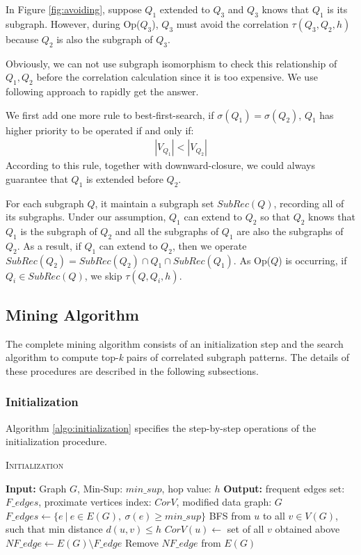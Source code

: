 \begin{exple}
	In Figure \ref{fig:avoiding}, suppose $Q_1$ extended to $Q_3$ and $Q_3$ knows that $Q_1$ is its subgraph. However, during {\sf Op($Q_3$)}, $Q_3$ must avoid the correlation $\tau(Q_3,Q_2,h)$ because $Q_2$ is also the subgraph of $Q_3$.
\end{exple}


Obviously, we can not use subgraph isomorphism to check this relationship of $Q_1,Q_2$ before the correlation calculation since it is too expensive. We use following approach to rapidly get the answer.
\par We first add one more rule to best-first-search, if $\sigma(Q_1)=\sigma(Q_2)$, $Q_1$ has higher priority to be operated if and only if:
\begin{align*} |V_{Q_1}|<|V_{Q_2}| \end{align*}
According to this rule, together with downward-closure, we could always
guarantee that $Q_1$ is extended before $Q_2$. \par For each subgraph $Q$, it
maintain a subgraph set $SubRec(Q)$, recording all of its subgraphs. Under our
assumption, $Q_1$ can extend to $Q_2$ so that $Q_2$ knows that $Q_1$ is the
subgraph of $Q_2$ and all the subgraphs of $Q_1$ are also the subgraphs of
$Q_2$. As a result, if $Q_1$ can extend to $Q_2$, then we operate
$SubRec(Q_2)=SubRec(Q_2)\cap Q_1\cap SubRec(Q_1)$. As {\sf Op($Q$)} is
occurring, if $Q_i\in SubRec(Q)$, we skip $\tau(Q,Q_i,h)$.

\subsection{Mining Algorithm}
\label{subsec:miningalgo}
The complete mining algorithm consists of an initialization step and the search
algorithm to compute top-\textit{k} pairs of correlated subgraph patterns. The
details of these procedures are described in the following subsections.
\subsubsection{Initialization}
\label{subsec:initialization}
Algorithm \ref{algo:initialization} specifies the step-by-step operations of the
initialization procedure.

\begin{algorithm}%
	\caption{\textsc{Initialization}}\label{algo:initialization}
	\dontprintsemicolon
	\nonl \textbf{Input:} Graph $G$, {\sf Min-Sup:} $min\_sup$, hop value: $h$\;
	\nonl \textbf{Output:} frequent edges set: $F\_edges$, proximate vertices
	index: $CorV$, modified data graph: $G$ \;
		$F\_edges\leftarrow \{e\ |\ e \in E(G),\ \sigma(e) \geq min\_sup \}$\;
		{\textsc{BFS} from $u$ to all $v\in V(G)$, such that min distance
		$d(u,v)\le h$\; $CorV(u) \leftarrow$ set of all $v$ obtained above\;}
		$NF\_edge\leftarrow E(G)\setminus F\_edge$ \; Remove $NF\_edge$ from
		$E(G)$\; \;
\end{algorithm}

